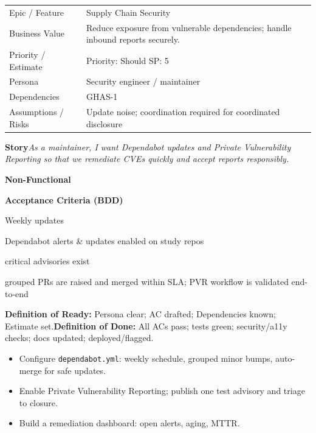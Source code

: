 \documentclass[11pt,a4paper]{article}
\newcommand{\cb}{\(\square\)}
\newenvironment{GHASCard}[2]{%
  \begin{tcolorbox}[ghascard,title={\ghasheader{#1 --- #2}}]
  \small
}{%
  \end{tcolorbox}
}
\newenvironment{GHASTasks}{%
  \begin{tcolorbox}[ghastasks]
  \small
  \begin{itemize}[label=\cb, leftmargin=*, labelsep=0.6em]
}{%
  \end{itemize}
  \end{tcolorbox}
}
\newcommand{\DoR}{\textbf{Definition of Ready:} Persona clear; AC drafted; Dependencies known; Estimate set.}
\newcommand{\DoD}{\textbf{Definition of Done:} All ACs pass; tests green; security/a11y checks; docs updated; deployed/flagged.}
\begin{document}
\begin{GHASCard}{GHAS-5}{Supply Chain: Dependabot, Advisories, PVR}
\begin{tabularx}{\linewidth}{L V}
Epic / Feature & Supply Chain Security \tabularnewline
Business Value & Reduce exposure from vulnerable dependencies; handle inbound reports securely. \tabularnewline
Priority / Estimate & Priority: Should \quad SP: 5 \tabularnewline
Persona & Security engineer / maintainer \tabularnewline
Dependencies & GHAS-1 \tabularnewline
Assumptions / Risks & Update noise; coordination required for coordinated disclosure \tabularnewline
\end{tabularx}

\medskip
\textbf{Story}\quad \emph{As a maintainer, I want Dependabot updates and Private Vulnerability Reporting so that we remediate CVEs quickly and accept reports responsibly.}

\medskip
\textbf{Non-Functional}\quad
{}\ 

\medskip
\textbf{Acceptance Criteria (BDD)}
\begin{description}[leftmargin=2.7cm, labelwidth=2.6cm, style=nextline]
  \item[\textbf{Scenario}] Weekly updates
  \item[\textbf{Given}] Dependabot alerts \& updates enabled on study repos
  \item[\textbf{When}] critical advisories exist
  \item[\textbf{Then}] grouped PRs are raised and merged within SLA; PVR workflow is validated end-to-end
\end{description}

\medskip
\DoR\quad\textbullet\quad\DoD
\end{GHASCard}

\begin{GHASTasks}
\item Configure \texttt{dependabot.yml}: weekly schedule, grouped minor bumps, auto-merge for safe updates.
\item Enable Private Vulnerability Reporting; publish one test advisory and triage to closure.
\item Build a remediation dashboard: open alerts, aging, MTTR.
\end{GHASTasks}
\clearpage
\end{document}
